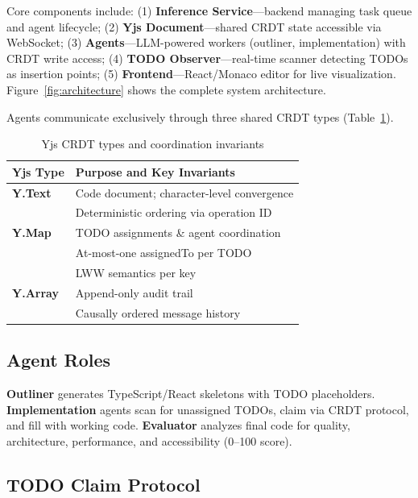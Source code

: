 \documentclass{article}
\begin{document}
Core components include: (1) \textbf{Inference Service}---backend managing task queue and agent lifecycle; (2) \textbf{Yjs Document}---shared CRDT state accessible via WebSocket; (3) \textbf{Agents}---LLM-powered workers (outliner, implementation) with CRDT write access; (4) \textbf{TODO Observer}---real-time scanner detecting TODOs as insertion points; (5) \textbf{Frontend}---React/Monaco editor for live visualization. Figure~\ref{fig:architecture} shows the complete system architecture.

Agents communicate exclusively through three shared CRDT types (Table~\ref{tab:crdttypes}).

\begin{table}[h!]
\caption{Yjs CRDT types and coordination invariants}
\label{tab:crdttypes}
\vskip 0.15in
\centering
\small
\begin{tabular}{ll}
\toprule
\textbf{Yjs Type} & \textbf{Purpose and Key Invariants} \\
\midrule
\textbf{Y.Text} & Code document; character-level convergence \\
& Deterministic ordering via operation ID \\
\midrule
\textbf{Y.Map} & TODO assignments \& agent coordination \\
& At-most-one assignedTo per TODO \\
& LWW semantics per key \\
\midrule
\textbf{Y.Array} & Append-only audit trail \\
& Causally ordered message history \\
\bottomrule
\end{tabular}
\end{table}

\FloatBarrier

\subsection{Agent Roles}

\textbf{Outliner} generates TypeScript/React skeletons with TODO placeholders. \textbf{Implementation} agents scan for unassigned TODOs, claim via CRDT protocol, and fill with working code. \textbf{Evaluator} analyzes final code for quality, architecture, performance, and accessibility (0--100 score).

\subsection{TODO Claim Protocol}
\end{document}
